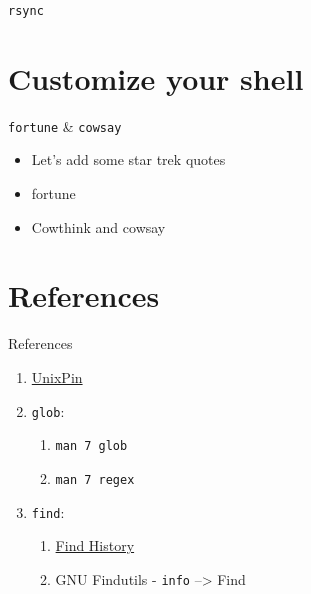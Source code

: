 \documentclass[11pt]{beamer}
\begin{document}
		\begin{frame}{ \texttt{rsync}}
			
		\end{frame}

	\section[Bling]{Customize your shell}

		\begin{frame}{\texttt{fortune} \& \texttt{cowsay}}
			\begin{itemize}
				\item Let's add some star trek quotes
				\item fortune
				\item Cowthink and cowsay
			\end{itemize}
		\end{frame}

	\section{References}

		\begin{frame}{References}
			\begin{enumerate}
				\item \href{http://find.unixpin.com/}{UnixPin}
				\item {
						\texttt{glob}:
						\begin{enumerate}
							\item \texttt{man 7 glob}
							\item \texttt{man 7 regex}
						\end{enumerate}
					}
				\item {
						\texttt{find}:
						\begin{enumerate}
							\item \href{http://doc.cat-v.org/unix/find-history}{Find History}
							\item GNU Findutils - \texttt{info} --> Find
						\end{enumerate}
					}
			\end{enumerate}
		\end{frame}

\end{document}
